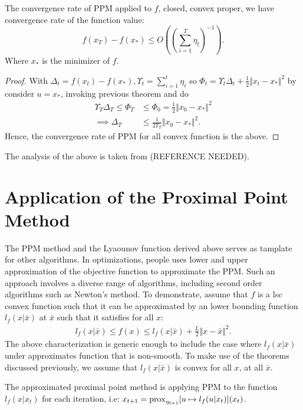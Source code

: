 \documentclass[12pt]{article}
\begin{document}
        \begin{theorem}
            The convergence rate of PPM applied to $f$, closed, convex proper, we have convergence rate of the function value: 
            $$
            f(x_T) - f(x_*) \le O\left(\left(\sum_{i=1}^{T}\eta_t\right)^{-1}\right). 
            $$
            Where $x_*$ is the minimizer of $f$. 
        \end{theorem}
        \begin{proof}
            With $\Delta_t = f(x_t) - f(x_*), \Upsilon_t = \sum_{i = 1}^{t}\eta_i$ so $\Phi_t = \Upsilon_t\Delta_t + \frac{1}{2}\Vert x_t - x_*\Vert^2$ by consider $u = x_*$, invoking previous theorem and do
            \begin{align*}
                \Upsilon_T\Delta_T \le \Phi_T 
                &\le 
                \Phi_0 = \frac{1}{2}\Vert x_0 - x_*\Vert^2 
                \\
                \implies \Delta_T 
                &\le 
                \frac{1}{2\Upsilon_T} \Vert x_0 - x_*\Vert^2. 
            \end{align*}
            Hence, the convergence rate of PPM for all convex function is the above. 
        \end{proof}
        \begin{remark}
            The analysis of the above is taken from (REFERENCE NEEDED). 
        \end{remark}
\section{Application of the Proximal Point Method}
    The PPM method and the Lyaounov function derived above serves as tamplate for other algorithms. 
    In optimizations, people uses lower and upper approximation of the objective function to approximate the PPM. 
    Such an approach involves a diverse range of algorithms, including second order algorithms such as Newton's method. 
    To demonstrate, assume that $f$ is a lsc convex function such that it can be approximated by an lower bounding function $l_f(x|\bar x)$ at $\bar x$ such that it satisfies for all $x$: 
    \begin{align}
        l_f(x| \bar x) 
        \le f(x) \le l_f(x|\bar x) + \frac{L}{2}\Vert x - \bar x\Vert^2. 
    \end{align}
    The above characterization is generic enough to include the case where $l_f(x|\bar x)$ under approximates function that is non-smooth. 
    To make use of the theorems discussed previously, we assume that $l_f(x|\bar x)$ is convex for all $x$, at all $\bar x$. 
    \par 
    The approximated proximal point method is applying PPM to the function $l_f(x|x_t)$ for each iteration, i.e: $x_{t +1} = \operatorname{prox}_{\eta_{t + 1}}[u\mapsto l_f(u | x_t)](x_t)$. 
    



\end{document}
